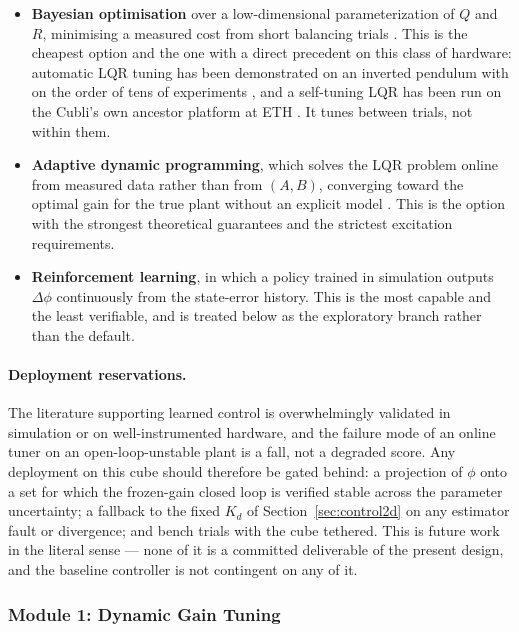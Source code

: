 \begin{itemize}
    \item \textbf{Bayesian optimisation} over a low-dimensional
    parameterization of $Q$ and $R$, minimising a measured cost from short
    balancing trials \cite{shahriari2016bayesopt}. This is the cheapest option
    and the one with a direct precedent on this class of hardware: automatic
    LQR tuning has been demonstrated on an inverted pendulum with on the order
    of tens of experiments \cite{marco2016automaticlqr}, and a self-tuning LQR
    has been run on the Cubli's own ancestor platform at ETH
    \cite{trimpe2014learningcubli}. It tunes between trials, not within them.
    \item \textbf{Adaptive dynamic programming}, which solves the LQR problem
    online from measured data rather than from $(A,B)$, converging toward the
    optimal gain for the true plant without an explicit model
    \cite{lewis2012adp}. This is the option with the strongest theoretical
    guarantees and the strictest excitation requirements.
    \item \textbf{Reinforcement learning}, in which a policy trained in
    simulation outputs $\Delta\phi$ continuously from the state-error history.
    This is the most capable and the least verifiable, and is treated below as
    the exploratory branch rather than the default.
\end{itemize}

\paragraph{Deployment reservations.} The literature supporting learned control
is overwhelmingly validated in simulation or on well-instrumented hardware,
and the failure mode of an online tuner on an open-loop-unstable plant is a
fall, not a degraded score. Any deployment on this cube should therefore be
gated behind: a projection of $\phi$ onto a set for which the frozen-gain
closed loop is verified stable across the parameter uncertainty; a fallback to
the fixed $K_d$ of Section~\ref{sec:control2d} on any estimator fault or
divergence; and bench trials with the cube tethered. This is future work in
the literal sense --- none of it is a committed deliverable of the present
design, and the baseline controller is not contingent on any of it.

\subsubsection{Module 1: Dynamic Gain Tuning}

